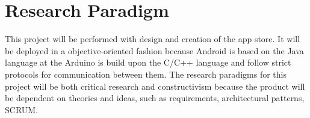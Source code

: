\section{Research Paradigm}

This project will be performed with design and creation of the app store. It will be deployed in a objective-oriented fashion because Android is based on the Java language at the Arduino is build upon the C/C++ language and follow strict protocols for communication between them. The research paradigms for this project will be both critical research and constructivism because the product will be dependent on theories and ideas, such as requirements, architectural patterns, SCRUM.